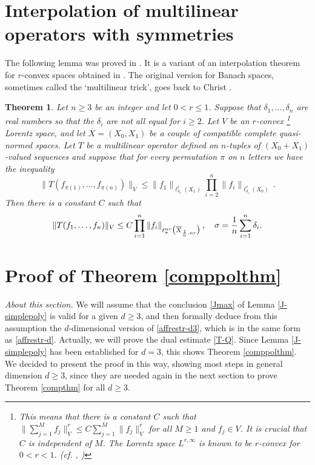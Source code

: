 \documentclass[11 pt]{amsart}
\theoremstyle{plain}
\newtheorem{theorem}{Theorem}[section]
\numberwithin{equation}{section}
\theoremstyle{plain}
\numberwithin{equation}{section}
\theoremstyle{remark}
\begin{document}
\section{Interpolation of multilinear operators with symmetries}
\label{interpolation}

The following lemma was proved in \cite{BOS3}. It is a variant of an
interpolation theorem for $r$-convex spaces obtained in
\cite{BOS1}. The original version for Banach spaces, sometimes called the `multilinear trick', goes back to Christ \cite{Ch}.

\begin{theorem}\label{multtrick}
Let $n\ge 3$ be an integer and let $0<r\le 1$. Suppose that $\delta_1,\dots, \delta_n$ are real numbers so that the
$\delta_i$ are not all equal for $i\ge 2$. Let $V$ be an $r$-convex \footnote{This means that there is a constant $C$ such that $\| \sum_{j=1}^M f_j\|_V^r \le C \sum_{j=1}^M \| f_j\|_V^r$ for all $M\ge 1$ and $f_j \in V$. It is crucial that $C$ is independent of $M$. The Lorentz space $L^{r,\infty}$ is known to be $r$-convex for $0<r<1$. ({\it cf.} \cite{kalton}, \cite{stw})} Lorentz space, and let
$\overline X=(X_0, X_1)$ be a couple of compatible complete quasi-normed spaces.
Let $T$ be a multilinear operator defined on $n$-tuples of $(X_0+X_1)$-valued sequences
and suppose that for every permutation $\pi$ on $n$ letters we have the
inequality
\begin{equation}\label{Thypothesis}
\|T(f_{\pi(1)},\dots, f_{\pi(n)})\|_{V} \le
 \|f_1\|_{\ell_{\delta_1}^r(X_1)}
\prod_{i=2}^n \|f_i\|_{\ell_{\delta_i}^r(X_0)}\,.
\end{equation}
Then there is a constant $C$ such that
\begin{equation}\label{Tconclusion}
\|T(f_1,\dots, f_n)\|_{V} \le C
\prod_{i=1}^n \|f_i\|_{\ell_{\sigma}^{n r} \big(\overline X_{{1\over n}, n r} \big)}\,,\quad
\sigma = {1\over n}\sum_{i=1}^n \delta_i .
\end{equation}
\end{theorem}

\section{Proof of Theorem \ref{comppolthm}}

{\sl About this section.} We will assume that the conclusion \eqref{Jmax} of Lemma \ref{J-simplepoly} is valid for a given $d\ge 3$, and then formally deduce from this assumption
the $d$-dimensional version of \eqref{affrestr-d3}, which is in the same form as \eqref{affrestr-d}. Actually, we will prove the dual estimate \eqref{T-Q}. Since Lemma \ref{J-simplepoly} has been established for $d=3$, this shows Theorem \ref{comppolthm}. We decided to present the proof in this way, showing most steps in general dimension $d\ge 3$, since they are needed again in the next section to prove Theorem \ref{compthm} for all $d\ge 3$.
\end{document}
